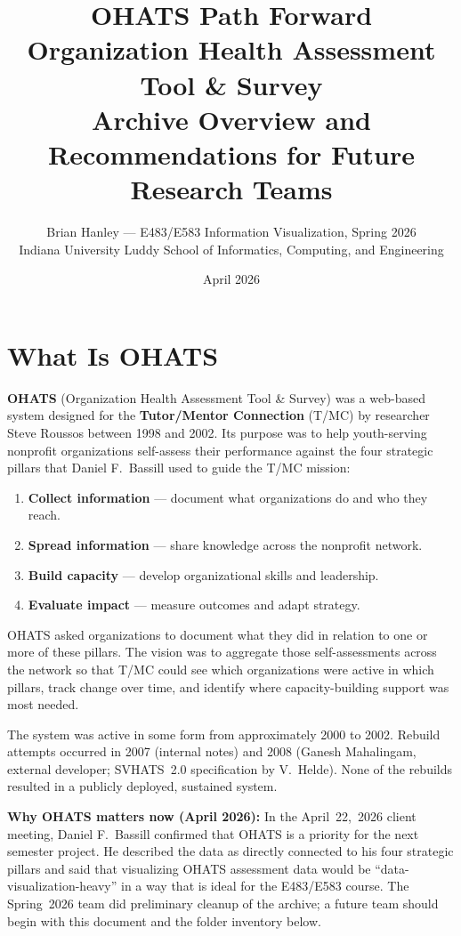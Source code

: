 \documentclass[12pt]{article}
\title{\textbf{OHATS Path Forward}\\
\large Organization Health Assessment Tool \& Survey\\
Archive Overview and Recommendations for Future Research Teams}
\author{Brian Hanley — E483/E583 Information Visualization, Spring 2026\\
Indiana University Luddy School of Informatics, Computing, and Engineering}
\date{April 2026}
\begin{document}
\maketitle
\tableofcontents
\newpage

\section{What Is OHATS}

\textbf{OHATS} (Organization Health Assessment Tool \& Survey) was a web-based
system designed for the \textbf{Tutor/Mentor Connection} (T/MC) by researcher
Steve Roussos between 1998 and 2002. Its purpose was to help youth-serving
nonprofit organizations self-assess their performance against the four
strategic pillars that Daniel F.\ Bassill used to guide the T/MC mission:

\begin{enumerate}[leftmargin=1.5em]
  \item \textbf{Collect information} — document what organizations do and who they reach.
  \item \textbf{Spread information} — share knowledge across the nonprofit network.
  \item \textbf{Build capacity} — develop organizational skills and leadership.
  \item \textbf{Evaluate impact} — measure outcomes and adapt strategy.
\end{enumerate}

OHATS asked organizations to document what they did in relation to one or
more of these pillars. The vision was to aggregate those self-assessments
across the network so that T/MC could see which organizations were active
in which pillars, track change over time, and identify where capacity-building
support was most needed.

The system was active in some form from approximately 2000 to 2002. Rebuild
attempts occurred in 2007 (internal notes) and 2008 (Ganesh Mahalingam,
external developer; SVHATS~2.0 specification by V.~Helde). None of
the rebuilds resulted in a publicly deployed, sustained system.

\begin{mdframed}[backgroundcolor=yellow!10, linecolor=orange!60]
\textbf{Why OHATS matters now (April 2026):} In the April~22,~2026
client meeting, Daniel F.\ Bassill confirmed that OHATS is a priority
for the next semester project. He described the data as directly connected
to his four strategic pillars and said that visualizing OHATS assessment
data would be ``data-visualization-heavy'' in a way that is ideal for the
E483/E583 course. The Spring~2026 team did preliminary cleanup of the
archive; a future team should begin with this document and the folder
inventory below.
\end{mdframed}
\end{document}
